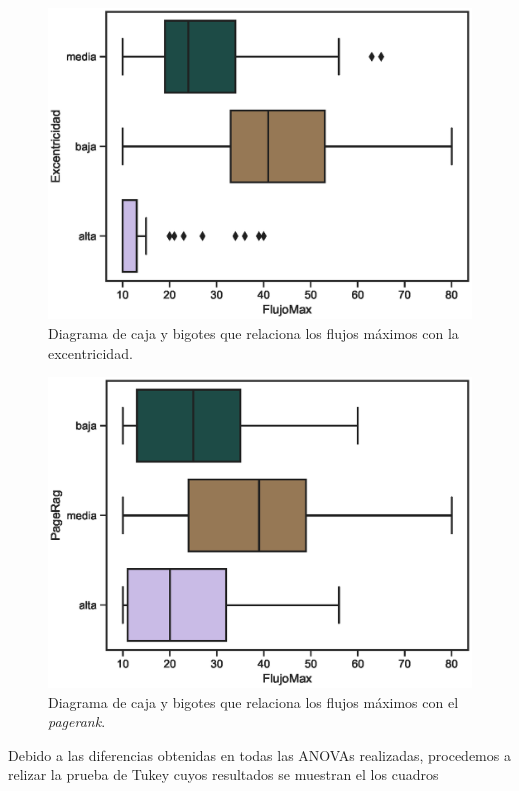 \documentclass{article}
\begin{document}
\begin{center}
\begin{figure}[htbp]
\includegraphics[scale=0.6]{boxplot_FlujoMaxExcentricidad.eps}
\caption{Diagrama de caja y bigotes que relaciona los flujos máximos con la excentricidad.}
\label{fig23}
\end{figure}
\end{center}

\begin{center}
\begin{figure}[htbp]
\includegraphics[scale=0.6]{boxplot_FlujoMaxPageRag.eps}
\caption{Diagrama de caja y bigotes que relaciona los flujos máximos con el  \textit{pagerank}.}
\label{fig24}
\end{figure}
\end{center}
 \newpage
Debido a las diferencias obtenidas en todas las ANOVAs realizadas, procedemos a relizar la prueba de Tukey cuyos resultados se muestran el los cuadros 
\end{document}
